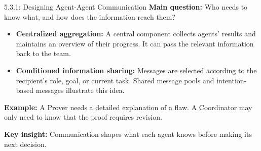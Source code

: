 \documentclass[aspectratio=169]{beamer}
\begin{document}
\begin{frame}{5.3.1: Designing Agent-Agent Communication}
\small
\textbf{Main question:} Who needs to know what, and how does the information reach them?

\vspace{0.2cm}
\begin{itemize}
    \item \textbf{Centralized aggregation:}
    A central component collects agents' results and maintains an overview of their progress. It can pass the relevant information back to the team.

    \vspace{0.2cm}
    \item \textbf{Conditioned information sharing:}
    Messages are selected according to the recipient's role, goal, or current task. Shared message pools and intention-based messages illustrate this idea.
\end{itemize}

\vspace{0.2cm}
\textbf{Example:} A Prover needs a detailed explanation of a flaw. A Coordinator may only need to know that the proof requires revision.

\vspace{0.2cm}
\textbf{Key insight:} Communication shapes what each agent knows before making its next decision.

\end{frame}
\end{document}
